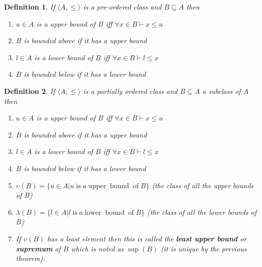 \documentclass{book}
\newcommand{\nobracket}{}
\newcommand{\tmop}[1]{\ensuremath{\operatorname{#1}}}
\newcommand{\tmtextbf}[1]{{\bfseries{#1}}}
\newtheorem{definition}{Definition}
{\theorembodyfont{\rmfamily}\newtheorem{example}{Example}}
\begin{document}
{{\begin{definition}
  \label{upper bound in pre-ordered set}If $\langle A, \leqslant \rangle$ is a
  pre-ordered class and $B \subseteq A$ then
  \begin{enumerate}
    \item $u \in A$ is a upper bound of $B$ iff $\forall x \in B \vdash x
    \leqslant u$
    
    \item $B$ is bounded above if it has a upper bound
    
    \item $l \in A$ is a lower bound of $B$ iff $\forall x \in B \vdash l
    \leqslant x$
    
    \item $B$ is bounded below if it has a lower bound
  \end{enumerate}
\end{definition}

\begin{definition}
  \label{upper bound}{}{}{}{}If $\langle A, \leqslant \rangle$ is a partially
  ordered class and $B \subseteq A$ a subclass of $A$ then
  \begin{enumerate}
    \item $u \in A$ is a upper bound of $B$ iff $\forall x \in B \vdash x
    \leqslant u$
    
    \item $B$ is bounded above if it has a upper bound
    
    \item $l \in A$ is a lower bound of $B$ iff $\forall x \in B \vdash l
    \leqslant x$
    
    \item $B$ is bounded below if it has a lower bound
    
    \item $\upsilon (B) = \{ u \in A | u \tmop{is} a \tmop{upper} \tmop{bound}
    \tmop{of} B \nobracket \}$ (the class of all the upper bounds of $B$)
    
    \item $\lambda (B) = \{ l \in A | l \tmop{is} a \tmop{lower} \tmop{bound}
    \tmop{of} B \nobracket \}$ (the class of all the lower bounds of $B$)
    
    \item If $\upsilon (B)$ has a least element then this is called the
    \tmtextbf{least upper bound} or \tmtextbf{supremum} of $B$ which is noted
    as $\sup (B)$ (it is unique by the previous theorem).
    

\end{enumerate}
\end{definition}}}
\end{document}

